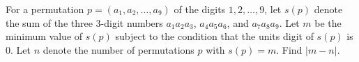 For a permutation $p = (a_1,a_2,\ldots,a_9)$ of the digits $1,2,\ldots,9$,  let $s(p)$ denote the sum of the three $3$-digit numbers $a_1a_2a_3$,  $a_4a_5a_6$,  and $a_7a_8a_9$. Let $m$ be the minimum value of $s(p)$ subject to the condition that the units digit of $s(p)$ is $0$. Let $n$ denote the number of permutations $p$ with $s(p) = m$. Find $|m - n|$.
